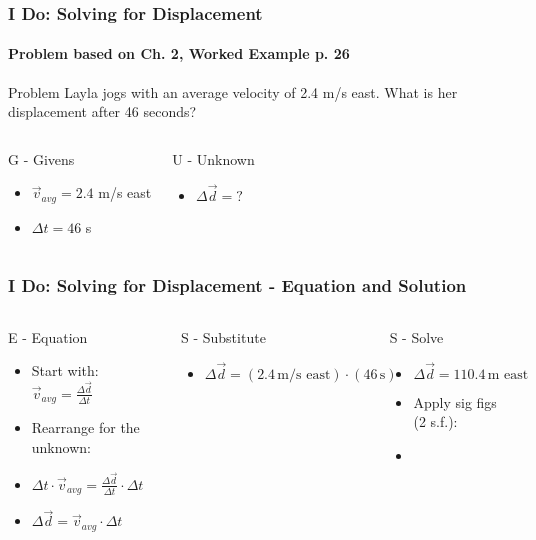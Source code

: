 \documentclass{beamer}
\begin{document}
\begin{frame}
\frametitle{I Do: Solving for Displacement}
\framesubtitle{Problem based on Ch. 2, Worked Example p. 26}
\begin{block}{Problem}
Layla jogs with an average velocity of 2.4 m/s east. What is her displacement after 46 seconds?
\end{block}
\pause
\begin{columns}[T]
\begin{block}{G - Givens}
\begin{itemize}
    \item $\vec{v}_{avg} = 2.4$ m/s east
    \item $\Delta t = 46$ s
\end{itemize}
\end{block}
\pause
{}
\begin{block}{U - Unknown}
\begin{itemize}
    \item $\Delta \vec{d} = ?$
\end{itemize}
\end{block}
\end{columns}
\end{frame}

\begin{frame}
\frametitle{I Do: Solving for Displacement - Equation and Solution}
\begin{columns}[T]
\begin{block}{E - Equation}
\begin{itemize}
    \item Start with: $\vec{v}_{avg} = \frac{\Delta \vec{d}}{\Delta t}$
    \item Rearrange for the unknown:
    \item $\Delta t \cdot \vec{v}_{avg} = \frac{\Delta \vec{d}}{\Delta t} \cdot \Delta t$
    \item \alert{$\Delta \vec{d} = \vec{v}_{avg} \cdot \Delta t$}
\end{itemize}
\end{block}
\pause
\begin{block}{S - Substitute}
\begin{itemize}
    \item $\Delta \vec{d} = (2.4 \, \text{m/s east}) \cdot (46 \, \text{s})$
\end{itemize}
\end{block}
\pause
\begin{block}{S - Solve}
\begin{itemize}
    \item $\Delta \vec{d} = 110.4 \, \text{m east}$
    \item Apply sig figs (2 s.f.):
    \item {}
\end{itemize}
\end{block}
\end{columns}
\end{frame}
\end{document}
